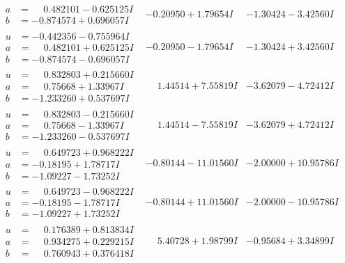 \documentclass[1p]{elsarticle_modified}
\theoremstyle{definition}
\begin{document}
$$\begin{array}{c|c|c}
\begin{aligned}
a &= \phantom{-}0.482101 - 0.625125 I \\
b &= -0.874574 + 0.696057 I\end{aligned}
 & -0.20950 + 1.79654 I & -1.30424 - 3.42560 I \\ \hline\begin{aligned}
u &= -0.442356 - 0.755964 I \\
a &= \phantom{-}0.482101 + 0.625125 I \\
b &= -0.874574 - 0.696057 I\end{aligned}
 & -0.20950 - 1.79654 I & -1.30424 + 3.42560 I \\ \hline\begin{aligned}
u &= \phantom{-}0.832803 + 0.215660 I \\
a &= \phantom{-}0.75668 + 1.33967 I \\
b &= -1.233260 + 0.537697 I\end{aligned}
 & \phantom{-}1.44514 + 7.55819 I & -3.62079 - 4.72412 I \\ \hline\begin{aligned}
u &= \phantom{-}0.832803 - 0.215660 I \\
a &= \phantom{-}0.75668 - 1.33967 I \\
b &= -1.233260 - 0.537697 I\end{aligned}
 & \phantom{-}1.44514 - 7.55819 I & -3.62079 + 4.72412 I \\ \hline\begin{aligned}
u &= \phantom{-}0.649723 + 0.968222 I \\
a &= -0.18195 + 1.78717 I \\
b &= -1.09227 - 1.73252 I\end{aligned}
 & -0.80144 - 11.01560 I & -2.00000 + 10.95786 I \\ \hline\begin{aligned}
u &= \phantom{-}0.649723 - 0.968222 I \\
a &= -0.18195 - 1.78717 I \\
b &= -1.09227 + 1.73252 I\end{aligned}
 & -0.80144 + 11.01560 I & -2.00000 - 10.95786 I \\ \hline\begin{aligned}
u &= \phantom{-}0.176389 + 0.813834 I \\
a &= \phantom{-}0.934275 + 0.229215 I \\
b &= \phantom{-}0.760943 + 0.376418 I\end{aligned}
 & \phantom{-}5.40728 + 1.98799 I & -0.95684 + 3.34899 I \\ \hline\begin{aligned}

\end{aligned}
\end{array}$$
\end{document}
